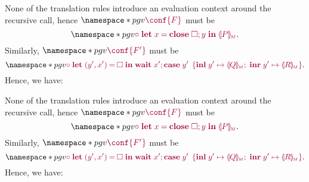 \begin{case*}
\begin{subcase*}
    None of the translation rules introduce an evaluation context around the recursive call, hence $\pgv{\tm{\conf{F}}}$ must be $$\pgv{\tm{\child\;\letbind{x}{\andthen{\close\;\hole}{y}}{\cpgvM{P}}}}.$$ Similarly, $\pgv{\tm{\conf{F'}}}$ must be $$\pgv{\tm{\child\;\letpair{y'}{x'}{\hole}{\andthen{\wait\;x'}{\casesum{y'}{y'}{\cpgvM{Q}}{y'}{\cpgvM{R}}}}}}.$$ Hence, we have:
    \begin{mathpar}
    \end{mathpar}
  \end{subcase*}
  \begin{subcase*}
    None of the translation rules introduce an evaluation context around the recursive call, hence $\pgv{\tm{\conf{F}}}$ must be $$\pgv{\tm{\child\;\letbind{x}{\andthen{\close\;\hole}{y}}{\cpgvM{P}}}}.$$ Similarly, $\pgv{\tm{\conf{F'}}}$ must be $$\pgv{\tm{\child\;\letpair{y'}{x'}{\hole}{\andthen{\wait\;x'}{\casesum{y'}{y'}{\cpgvM{Q}}{y'}{\cpgvM{R}}}}}}.$$ Hence, we have:
    \begin{mathpar}
\end{mathpar}
\end{subcase*}
\end{case*}
